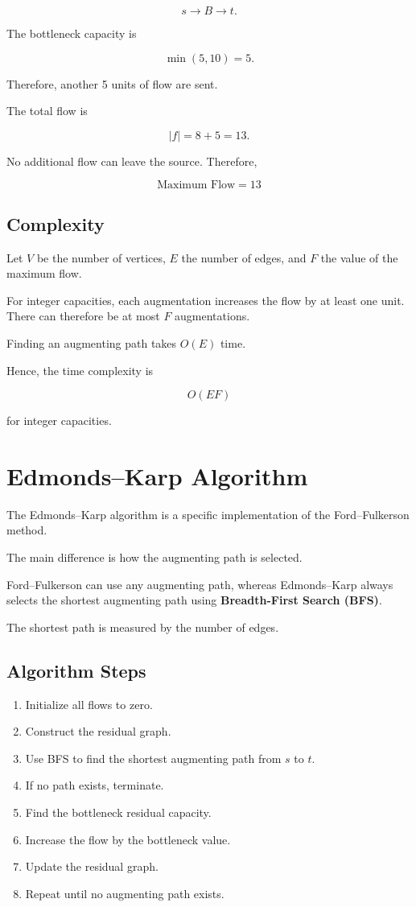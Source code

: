 \documentclass[12pt,a4paper]{article}
\begin{document}
\[
s \rightarrow B \rightarrow t.
\]

The bottleneck capacity is

\[
\min(5,10)=5.
\]

Therefore, another 5 units of flow are sent.

The total flow is

\[
|f| = 8+5=13.
\]

No additional flow can leave the source. Therefore,

\[
\boxed{\text{Maximum Flow}=13}
\]

\subsection{Complexity}

Let $V$ be the number of vertices, $E$ the number of edges, and $F$
the value of the maximum flow.

For integer capacities, each augmentation increases the flow by at least
one unit. There can therefore be at most $F$ augmentations.

Finding an augmenting path takes $O(E)$ time.

Hence, the time complexity is

\[
\boxed{O(EF)}
\]

for integer capacities.

\section{Edmonds--Karp Algorithm}

The Edmonds--Karp algorithm is a specific implementation of the
Ford--Fulkerson method.

The main difference is how the augmenting path is selected.

Ford--Fulkerson can use any augmenting path, whereas Edmonds--Karp
always selects the shortest augmenting path using
\textbf{Breadth-First Search (BFS)}.

The shortest path is measured by the number of edges.

\subsection{Algorithm Steps}

\begin{enumerate}
    \item Initialize all flows to zero.
    \item Construct the residual graph.
    \item Use BFS to find the shortest augmenting path from $s$ to $t$.
    \item If no path exists, terminate.
    \item Find the bottleneck residual capacity.
    \item Increase the flow by the bottleneck value.
    \item Update the residual graph.
    \item Repeat until no augmenting path exists.
\end{enumerate}
\end{document}
